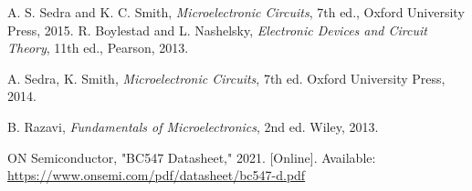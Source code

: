 \documentclass[conference]{IEEEtran}
\begin{document}
\begin{thebibliography}{9}
 A. S. Sedra and K. C. Smith, \textit{Microelectronic Circuits}, 7th ed., Oxford University Press, 2015.
 R. Boylestad and L. Nashelsky, \textit{Electronic Devices and Circuit Theory}, 11th ed., Pearson, 2013.

	
    A. Sedra, K. Smith, \textit{Microelectronic Circuits}, 7th ed. Oxford University Press, 2014.

    B. Razavi, \textit{Fundamentals of Microelectronics}, 2nd ed. Wiley, 2013.

    ON Semiconductor, "BC547 Datasheet," 2021. [Online]. Available: \url{https://www.onsemi.com/pdf/datasheet/bc547-d.pdf}
    

\end{thebibliography}
\end{document}
